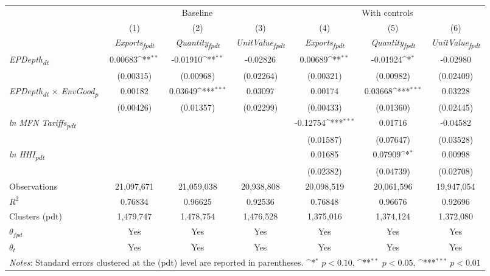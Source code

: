 {
\def\sym#1{\ifmmode^{#1}\else\(^{#1}\)\fi}
\begin{tabular}{l*{6}{c}}
\toprule
&\multicolumn{3}{c}{Baseline}&\multicolumn{3}{c}{With controls}\\\cmidrule(lr){2-4}\cmidrule(lr){5-7}
&(1)&(2)&(3)&(4)&(5)&(6)\\
&\textit{Exports\textsubscript{fpdt}}&\textit{Quantity\textsubscript{fpdt}}&\textit{UnitValue\textsubscript{fpdt}}&\textit{Exports\textsubscript{fpdt}}&\textit{Quantity\textsubscript{fpdt}}&\textit{UnitValue\textsubscript{fpdt}}\\
\midrule
\textit{EPDepth\textsubscript{dt}} & 0.00683\sym{**} & -0.01910\sym{**} & -0.02826 & 0.00689\sym{**} & -0.01924\sym{*} & -0.02980\\
 & (0.00315) & (0.00968) & (0.02264) & (0.00321) & (0.00982) & (0.02409)\\
\addlinespace
\textit{EPDepth\textsubscript{dt} $\times$ EnvGood\textsubscript{p}} & 0.00182 & 0.03649\sym{***} & 0.03097 & 0.00174 & 0.03668\sym{***} & 0.03228\\
 & (0.00426) & (0.01357) & (0.02299) & (0.00433) & (0.01360) & (0.02445)\\
\addlinespace
\textit{ln MFN Tariffs\textsubscript{pdt}} &  &  &  & -0.12754\sym{***} & 0.01716 & -0.04582\\
 &  &  &  & (0.01587) & (0.07647) & (0.03528)\\
\addlinespace
\textit{ln HHI\textsubscript{pdt}} &  &  &  & 0.01685 & 0.07909\sym{*} & 0.00998\\
 &  &  &  & (0.02382) & (0.04739) & (0.02708)\\
\midrule
Observations & 21,097,671 & 21,059,038 & 20,938,808 & 20,098,519 & 20,061,596 & 19,947,054\\
$R^{2}$ & 0.76834 & 0.96625 & 0.92536 & 0.76848 & 0.96676 & 0.92696\\
Clusters (pdt) & 1,479,747 & 1,478,754 & 1,476,528 & 1,375,016 & 1,374,124 & 1,372,080\\
$\theta_{fpd}$ & Yes & Yes & Yes & Yes & Yes & Yes\\
$\theta_{t}$ & Yes & Yes & Yes & Yes & Yes & Yes\\
\bottomrule
\multicolumn{7}{l}{\footnotesize \textit{Notes}: Standard errors clustered at the (pdt) level are reported in parentheses. \sym{*} \(p<0.10\), \sym{**} \(p<0.05\), \sym{***} \(p<0.01\)}\\
\end{tabular}
}
